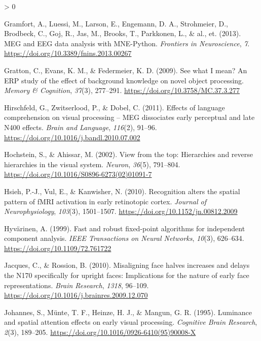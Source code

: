 \documentclass[
  english,
  man,floatsintext]{apa7}
\newlength{\cslhangindent}
\newenvironment{CSLReferences}[2] %
 {%
  \setlength{\parindent}{0pt}
  \ifodd #1 \everypar{\setlength{\hangindent}{\cslhangindent}}\ignorespaces\fi
  \ifnum #2 > 0
  \setlength{\parskip}{#2\baselineskip}
  \fi
 }%
 {}
\begin{document}
\begin{CSLReferences}{1}{0}
\leavevmode\hypertarget{ref-gramfort2013}{}%
Gramfort, A., Luessi, M., Larson, E., Engemann, D. A., Strohmeier, D., Brodbeck, C., Goj, R., Jas, M., Brooks, T., Parkkonen, L., \& al., et. (2013). MEG and {EEG} data analysis with {MNE-Python}. \emph{Frontiers in Neuroscience}, \emph{7}. \url{https://doi.org/10.3389/fnins.2013.00267}

\leavevmode\hypertarget{ref-gratton2009}{}%
Gratton, C., Evans, K. M., \& Federmeier, K. D. (2009). See what {I} mean? An {ERP} study of the effect of background knowledge on novel object processing. \emph{Memory \& Cognition}, \emph{37}(3), 277--291. \url{https://doi.org/10.3758/MC.37.3.277}

\leavevmode\hypertarget{ref-hirschfeld2011}{}%
Hirschfeld, G., Zwitserlood, P., \& Dobel, C. (2011). Effects of language comprehension on visual processing -- MEG dissociates early perceptual and late N400 effects. \emph{Brain and Language}, \emph{116}(2), 91--96. \url{https://doi.org/10.1016/j.bandl.2010.07.002}

\leavevmode\hypertarget{ref-hochstein2002}{}%
Hochstein, S., \& Ahissar, M. (2002). View from the top: Hierarchies and reverse hierarchies in the visual system. \emph{Neuron}, \emph{36}(5), 791--804. \url{https://doi.org/10.1016/S0896-6273(02)01091-7}

\leavevmode\hypertarget{ref-hsieh2010}{}%
Hsieh, P.-J., Vul, E., \& Kanwisher, N. (2010). Recognition alters the spatial pattern of {fMRI} activation in early retinotopic cortex. \emph{Journal of Neurophysiology}, \emph{103}(3), 1501--1507. \url{https://doi.org/10.1152/jn.00812.2009}

\leavevmode\hypertarget{ref-hyvuxe4rinen1999}{}%
Hyvärinen, A. (1999). Fast and robust fixed-point algorithms for independent component analysis. \emph{IEEE Transactions on Neural Networks}, \emph{10}(3), 626--634. \url{https://doi.org/10.1109/72.761722}

\leavevmode\hypertarget{ref-jacques2010}{}%
Jacques, C., \& Rossion, B. (2010). Misaligning face halves increases and delays the {N170} specifically for upright faces: Implications for the nature of early face representations. \emph{Brain Research}, \emph{1318}, 96--109. \url{https://doi.org/10.1016/j.brainres.2009.12.070}

\leavevmode\hypertarget{ref-johannes1995}{}%
Johannes, S., Münte, T. F., Heinze, H. J., \& Mangun, G. R. (1995). Luminance and spatial attention effects on early visual processing. \emph{Cognitive Brain Research}, \emph{2}(3), 189--205. \url{https://doi.org/10.1016/0926-6410(95)90008-X}


\end{CSLReferences}
\end{document}
